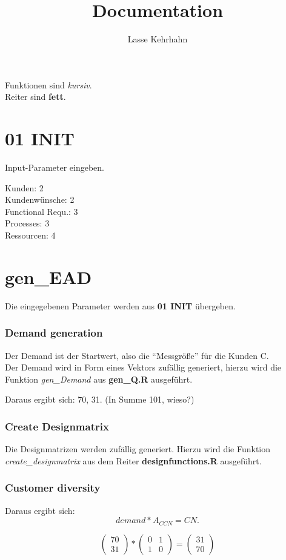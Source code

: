 \documentclass[
]{article}
\title{Documentation}
\author{Lasse Kehrhahn}
\date{}
\begin{document}
\maketitle

Funktionen sind \emph{kursiv}.\\
Reiter sind \textbf{fett}.

\hypertarget{init}{%
\section{01 INIT}\label{init}}

Input-Parameter eingeben.

Kunden: 2\\
Kundenwünsche: 2\\
Functional Requ.: 3\\
Processes: 3\\
Ressourcen: 4

\hypertarget{gen_ead}{%
\section{gen\_EAD}\label{gen_ead}}

Die eingegebenen Parameter werden aus \textbf{01 INIT} übergeben.

\hypertarget{demand-generation}{%
\subsubsection{Demand generation}\label{demand-generation}}

Der Demand ist der Startwert, also die ``Messgröße'' für die Kunden C.\\
Der Demand wird in Form eines Vektors zufällig generiert, hierzu wird
die Funktion \emph{gen\_Demand} aus \textbf{gen\_Q.R} ausgeführt.

Daraus ergibt sich: 70, 31. (In Summe 101, wieso?)

\hypertarget{create-designmatrix}{%
\subsubsection{Create Designmatrix}\label{create-designmatrix}}

Die Designmatrizen werden zufällig generiert. Hierzu wird die Funktion
\emph{create\_designmatrix} aus dem Reiter \textbf{designfunctions.R}
ausgeführt.

\hypertarget{customer-diversity}{%
\subsubsection{Customer diversity}\label{customer-diversity}}

Daraus ergibt sich: \[
demand*A_{CCN} = CN.
\]

\[
\left(\begin{array}{cc} 
70\\
31
\end{array}\right)
* \left(\begin{array}{cc} 
0 & 1\\
1 & 0
\end{array}\right)
= \left(\begin{array}{cc} 
31\\ 
70
\end{array}\right)
\]
\end{document}
